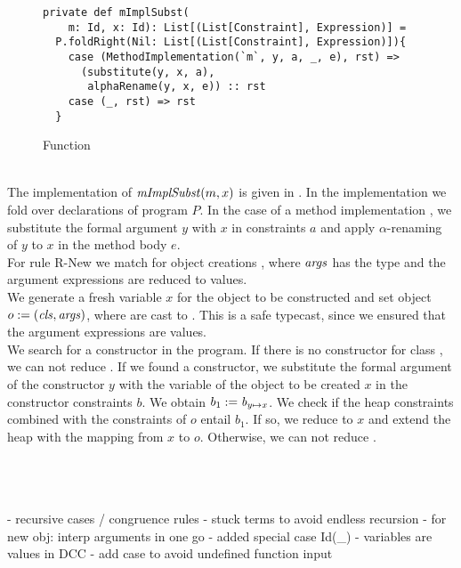 %
\begin{figure}[h]
\begin{lstlisting}
private def mImplSubst(
    m: Id, x: Id): List[(List[Constraint], Expression)] =
  P.foldRight(Nil: List[(List[Constraint], Expression)]){
    case (MethodImplementation(`m`, y, a, _, e), rst) =>
      (substitute(y, x, a),
       alphaRename(y, x, e)) :: rst
    case (_, rst) => rst
  }
\end{lstlisting}
\caption{Function }
\label{fig:scala-mimpl}
\end{figure}\\
%
The implementation of $\mathit{mImplSubst}(m, x)$ is given in .
In the implementation we fold over declarations of program $P$.
In the case of a method implementation ,
we substitute the formal argument $y$ with $x$ in constraints $a$
and apply $\alpha$-renaming of $y$ to $x$ in the method body $e$.\\
%
For rule R-New we match for object creations ,
where $\mathit{args}$ has the type 
and the argument expressions are reduced to values.\\
We generate a fresh variable $x$ for the object to be constructed
and set object $o := (\mathit{cls}, \mathit{args})$, %
where  are cast to .
This is a safe typecast, since we ensured
that the argument expressions are values.\\
We search for a constructor  in the program.
If there is no constructor for class ,
we can not reduce .
If we found a constructor,
we substitute the formal argument of the constructor $y$
with the variable of the object to be created $x$
in the constructor constraints $b$.
We obtain $b_1 := \mathit{b}_{\mathit{y} \mapsto \mathit{x}}$.
We check if the heap constraints combined
with the constraints of $o$ entail $b_1$.
If so, we reduce  to $x$
and extend the heap with the mapping from $x$ to $o$.
Otherwise, we can not reduce .


\quad\\\\\\
- recursive cases / congruence rules
  - stuck terms to avoid endless recursion
  - for new obj: interp arguments in one go  
- added special case Id(_)
  - variables are values in DCC
  - add case to avoid undefined function input

